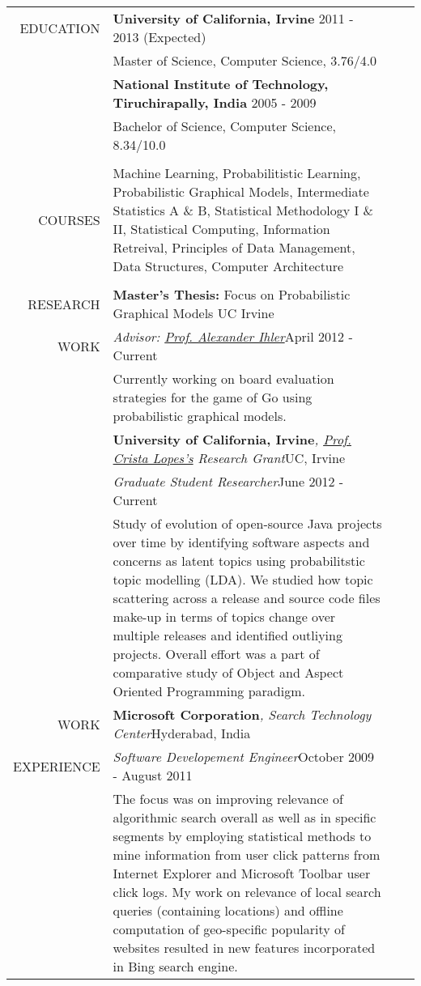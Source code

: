 \documentclass[a4paper]{article}
\begin{document}
\noindent
\begin{tabularx}{\textwidth}{rX lX}
  EDUCATION & \textbf{University of California, Irvine} \hfill 2011 - 2013 (Expected)\\
  & Master of Science, Computer Science, 3.76/4.0\\
  [.5\baselineskip]
  & \textbf{National Institute of Technology, Tiruchirapally, India} \hfill 2005 - 2009\\
  & Bachelor of Science, Computer Science, 8.34/10.0\\
  \\*
  COURSES & Machine Learning, Probabilitistic Learning, Probabilistic Graphical Models, Intermediate Statistics A \& B, Statistical Methodology I \& II, Statistical Computing, Information Retreival, Principles of Data Management, Data Structures, Computer Architecture\\
  \\*
  RESEARCH & \textbf{Master's Thesis:} Focus on Probabilistic Graphical Models \hfill UC Irvine\\
  WORK & \textit{Advisor: \href{http://www.ics.uci.edu/~ihler}{Prof. Alexander Ihler}}\hfill April 2012 - Current\\
  & Currently working on board evaluation strategies for the game of Go using probabilistic graphical models.\\
  [.5\baselineskip]
  & \textbf{University of California, Irvine}\textit{, \href{http://www.ics.uci.edu/~lopes/}{Prof. Crista Lopes's} Research Grant}\hfill UC, Irvine\\
  & \textit{Graduate Student Researcher}\hfill June 2012 - Current\\
  & Study of evolution of open-source Java projects over time by identifying software aspects and concerns as latent topics using probabilitstic topic modelling (LDA). We studied how topic scattering across a release and source code files make-up in terms of topics change over multiple releases and identified outliying projects. Overall effort was a part of comparative study of Object and Aspect Oriented Programming paradigm.\\
  [.5\baselineskip]
  WORK & \textbf{Microsoft Corporation}\textit{, Search Technology Center}\hfill Hyderabad, India\\
  EXPERIENCE & \textit{Software Developement Engineer}\hfill October 2009 - August 2011\\
  & The focus was on improving relevance of algorithmic search overall as well as in specific segments by employing statistical methods to mine information from user click patterns from Internet Explorer and Microsoft Toolbar user click logs. My work on relevance of local search queries (containing locations) and offline computation of geo-specific popularity of websites resulted in new features incorporated in Bing search engine.\\

\end{tabularx}
\end{document}

